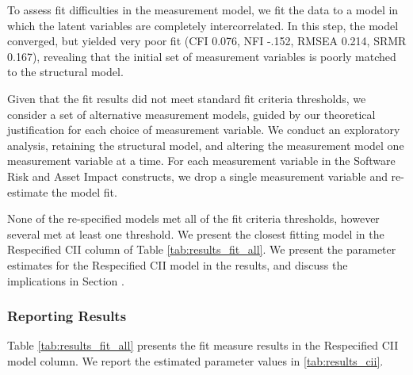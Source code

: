 To assess fit difficulties in the measurement model, we fit the data to a model in which the latent variables are completely intercorrelated. In this step, the model converged, but yielded very poor fit (CFI 0.076, NFI -.152, RMSEA 0.214, SRMR 0.167), revealing that the initial set of measurement variables is poorly matched to the structural model.  

Given that the fit results did not meet standard fit criteria thresholds, we consider a set of alternative measurement models, guided by our theoretical justification for each choice of measurement variable. We conduct an exploratory analysis, retaining the structural model, and altering the measurement model one measurement variable at a time. For each measurement variable in the Software Risk and Asset Impact constructs, we drop a single measurement variable and re-estimate the model fit. 

None of the re-specified models met all of the fit criteria thresholds, however several met at least one threshold. We present the closest fitting model in the Respecified CII column of Table \ref{tab:results_fit_all}. We present the parameter estimates for the Respecified CII model in the results, and discuss the implications in Section \label{sec:case_cii_discussion}.

\subsubsection{Reporting Results}
\label{sec:case_cii_results}

Table \ref{tab:results_fit_all} presents the fit measure results in the Respecified CII model column. We report the estimated parameter values in \ref{tab:results_cii}.

